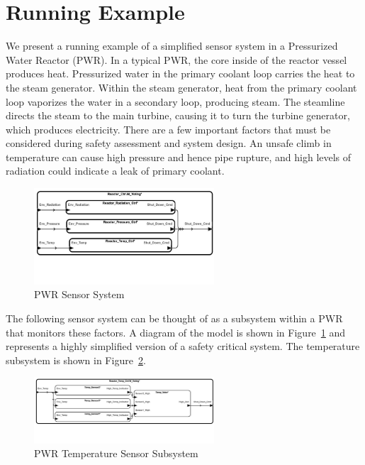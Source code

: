 \section{Running Example}
\label{sec:example}
We present a running example of a simplified sensor system in a Pressurized Water Reactor (PWR). In a typical PWR, the core inside of the reactor vessel produces heat. Pressurized water in the primary coolant loop carries the heat to the steam generator. Within the steam generator, heat from the primary coolant loop vaporizes the water in a secondary loop, producing steam. The steamline directs the steam to the main turbine, causing it to turn the turbine generator, which produces electricity. There are a few important factors that must be considered during safety assessment and system design. An unsafe climb in temperature can cause high pressure and hence pipe rupture, and high levels of radiation could indicate a leak of primary coolant. 

\begin{figure}[h!]
	\begin{center}
		\includegraphics[width=0.6\textwidth]{images/sensorSys.jpg}
	\end{center}
	\vspace{-4em}
	\caption{PWR Sensor System}
	\label{fig:sensorSys}
\end{figure}

The following sensor system can be thought of as a subsystem within a PWR that monitors these factors. A diagram of the model is shown in Figure~\ref{fig:sensorSys} and represents a highly simplified version of a safety critical system. The temperature subsystem is shown in Figure~\ref{fig:sensorSubsys}.

\begin{figure}[h!]
	\begin{center}
		\includegraphics[width=0.6\textwidth]{images/sensorSubsys.jpg}
	\end{center}
	\vspace{-3em}
	\caption{PWR Temperature Sensor Subsystem}
	\label{fig:sensorSubsys}
\end{figure}

